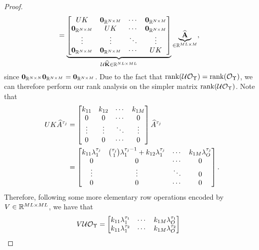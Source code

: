\begin{proof}
\begin{align*}
 &=  
  \underbrace{
  \begin{bmatrix}
  UK   & \mathbf{0}_{\mathbb{R}^{N\times M}} & \cdots & \mathbf{0}_{\mathbb{R}^{N\times M}}\\
  \mathbf{0}_{\mathbb{R}^{N\times M}} & UK   & \cdots & \mathbf{0}_{\mathbb{R}^{N\times M}}\\
  \vdots  & \vdots  & \ddots & \vdots\\
  \mathbf{0}_{\mathbb{R}^{N\times M}} & \mathbf{0}_{\mathbb{R}^{N\times M}} & \cdots & UK
 \end{bmatrix}}_{\mathcal{U}\widehat{\mathbf{K}}\in\mathbb{R}^{NL\times ML}}
 \underbrace{\widehat{\mathbf{A}}}_{\in\mathbb{R}^{ML\times M}},
\end{align*}
since $\mathbf{0}_{\mathbb{R}^{N\times N}}\mathbf{0}_{\mathbb{R}^{N\times M}} = \mathbf{0}_{\mathbb{R}^{N\times M}}$. Due to the fact that $\operatorname{rank}(\mathcal{U}\mathcal{O}_{\Upsilon}) = \operatorname{rank}(\mathcal{O}_{\Upsilon})$,
we can therefore perform our rank analysis on the simpler matrix $\operatorname{rank}(\mathcal{U}\mathcal{O}_{\Upsilon})$. Note that
\begin{align*}
 UK \widehat{A}^{\tau_j} &=  
 \begin{bmatrix}
  k_{11} & k_{12} & \cdots & k_{1M}\\
  0 & 0 & \cdots & 0\\
  \vdots & \vdots & \ddots & \vdots\\
  0 & 0 & \cdots & 0
 \end{bmatrix}
 \widehat{A}^{\tau_j}\\
 &= 
 \begin{bmatrix}
  k_{11}\lambda_1^{\tau_j} & \binom{\tau_j}{1}\lambda_1^{\tau_j-1} + k_{12}\lambda_1^{\tau_j}  & \cdots & k_{1M}\lambda_{O}^{\tau_j}\\
  0 & 0 & \cdots & 0\\
  \vdots & \vdots & \ddots & 0\\
  0 & 0 & \cdots & 0
 \end{bmatrix}.  
\end{align*}
Therefore, following some more elementary row operations encoded by $V\in\mathbb{R}^{ML\times ML}$, we have that
\begin{align*}
 V \mathcal{U}\mathcal{O}_{\Upsilon}
   &= 
   \begin{bmatrix}
    k_{11}\lambda_1^{\tau_1} & \cdots & k_{1M}\lambda_{O}^{\tau_1}\\
    k_{11}\lambda_1^{\tau_2} & \cdots & k_{1M}\lambda_{O}^{\tau_2}\\

\end{bmatrix}
\end{align*}
\end{proof}
